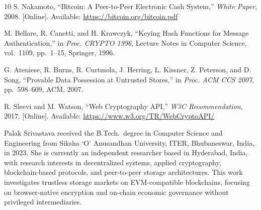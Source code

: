 \documentclass[journal]{IEEEtran}
\begin{document}
\begin{thebibliography}{10}
S. Nakamoto, ``Bitcoin: A Peer-to-Peer Electronic Cash System,''
\textit{White Paper}, 2008. [Online]. Available: \url{https://bitcoin.org/bitcoin.pdf}

M. Bellare, R. Canetti, and H. Krawczyk, ``Keying Hash Functions for
Message Authentication,'' in \textit{Proc. CRYPTO 1996}, Lecture Notes
in Computer Science, vol.~1109, pp.~1--15, Springer, 1996.

G. Ateniese, R. Burns, R. Curtmola, J. Herring, L. Kissner, Z. Peterson,
and D. Song, ``Provable Data Possession at Untrusted Stores,''
in \textit{Proc. ACM CCS 2007}, pp.~598--609, ACM, 2007.

R. Sleevi and M. Watson, ``Web Cryptography API,''
\textit{W3C Recommendation}, 2017. [Online]. Available:
\url{https://www.w3.org/TR/WebCryptoAPI/}

\end{thebibliography}

\begin{IEEEbiography}{Palak Srivastava}
received the B.Tech.\ degree in Computer Science and Engineering from
Siksha `O' Anusandhan University, ITER, Bhubaneswar, India, in 2023.
She is currently an independent researcher based in Hyderabad, India,
with research interests in decentralized systems, applied cryptography,
blockchain-based protocols, and peer-to-peer storage architectures.
This work investigates trustless storage markets on EVM-compatible
blockchains, focusing on browser-native encryption and on-chain
economic governance without privileged intermediaries.
\end{IEEEbiography}
\end{document}

